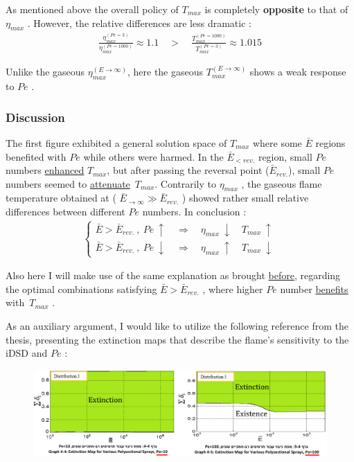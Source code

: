 \documentclass[12pt]{article}
\numberwithin{equation}{section}
\begin{document}
\begin{flushleft}
As mentioned above the overall policy of $T_{max}$ is completely \textbf{opposite} to that of $\eta_{max}$ . However, the relative differences are less dramatic :
\begin{align*}
\frac{\eta_{max}^{(Pe=3)}}{\eta_{max}^{(Pe=1000)}} \approx 1.1 \quad > \quad \frac{T_{max}^{(Pe=1000)}}{T_{max}^{(Pe=3)}} \approx 1.015
\end{align*}

Unlike the gaseous $\eta_{max}^{(E \rightarrow \infty)}$, here the gaseous $T_{max}^{(E \rightarrow \infty)}$ shows a weak response to $Pe$ .

\subsubsection{Discussion}
The first figure exhibited a general solution space of $T_{max}$ where some $\bar{E}$ regions benefited with $Pe$ while others were harmed. In the $\bar{E}_{< rev.}$ region, small $Pe$ numbers \underline{enhanced} $T_{max}$, but after passing the reversal point ($\bar{E}_{rev.}$), small $Pe$ numbers seemed to \underline{attenuate} \,$T_{max}$. Contrarily to $\eta_{max}$ , the gaseous flame temperature obtained at ( $\bar{E}_{\rightarrow \infty} \gg \bar{E}_{rev.}$ ) showed rather small relative differences between different $Pe$ numbers. In conclusion :
\begin{align*}
\begin{cases}
\bar{E} > \bar{E}_{rev.} \ , \ Pe \ \uparrow \quad \Rightarrow \quad \eta_{max} \ \downarrow \quad T_{max} \ \uparrow \\
\bar{E} > \bar{E}_{rev.} \ , \ Pe \ \downarrow \quad \Rightarrow \quad \eta_{max} \ \uparrow \quad T_{max} \ \downarrow
\end{cases} 
\end{align*}

Also here I will make use of the same explanation as brought \hyperref[opt_question]{before}, regarding the optimal combinations satisfying $\bar{E} > \bar{E}_{rev.}$ , where higher $Pe$ number \underline{benefits} with \,$T_{max}$ . 

As an auxiliary argument, I would like to utilize the following reference from the thesis, presenting the extinction maps that describe the flame's sensitivity to the iDSD and $Pe$ : \vspace{4mm}

\begin{figure}[H]
\centering
\includegraphics[width=1.2 \linewidth, center]{extinction.png}
\end{figure}


\end{flushleft}
\end{document}
